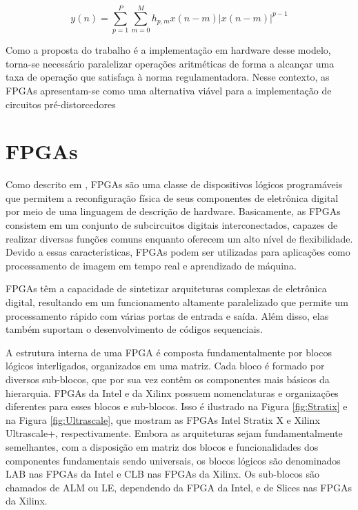 \begin{equation}
    y(n) = \sum_{p=1}^{P} \sum_{m=0}^{M} h_{p,m} x(n - m) \left| x(n - m) \right|^{p-1}
    \label{eq:mp}
\end{equation}

Como a proposta do trabalho é a implementação em hardware desse modelo, torna-se necessário paralelizar operações aritméticas de forma a alcançar uma taxa de operação que satisfaça à norma regulamentadora. Nesse contexto, as FPGAs apresentam-se como uma alternativa viável para a implementação de circuitos pré-distorcedores 

\section{FPGAs}

Como descrito em \cite{Pedroni2010}, FPGAs são uma classe de dispositivos lógicos programáveis que permitem a reconfiguração física de seus componentes de eletrônica digital por meio de uma linguagem de descrição de hardware. Basicamente, as FPGAs consistem em um conjunto de subcircuitos digitais interconectados, capazes de realizar diversas funções comuns enquanto oferecem um alto nível de flexibilidade. Devido a essas características, FPGAs podem ser utilizadas para aplicações como processamento de imagem em tempo real e aprendizado de máquina.

FPGAs têm a capacidade de sintetizar arquiteturas complexas de eletrônica digital, resultando em um funcionamento altamente paralelizado que permite um processamento rápido com várias portas de entrada e saída. Além disso, elas também suportam o desenvolvimento de códigos sequenciais.

A estrutura interna de uma FPGA é composta fundamentalmente por blocos lógicos interligados, organizados em uma matriz. Cada bloco é formado por diversos sub-blocos, que por sua vez contêm os componentes mais básicos da hierarquia. FPGAs da Intel e da Xilinx possuem nomenclaturas e organizações diferentes para esses blocos e sub-blocos. Isso é ilustrado na Figura \ref{fig:Stratix} e na Figura \ref{fig:Ultrascale}, que mostram as FPGAs Intel Stratix X e Xilinx Ultrascale+, respectivamente. Embora as arquiteturas sejam fundamentalmente semelhantes, com a disposição em matriz dos blocos e funcionalidades dos componentes fundamentais sendo universais, os blocos lógicos são denominados LAB nas FPGAs da Intel e CLB nas FPGAs da Xilinx. Os sub-blocos são chamados de ALM ou LE, dependendo da FPGA da Intel, e de Slices nas FPGAs da Xilinx.

